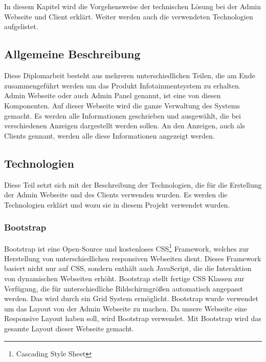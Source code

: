 \chapter{\docname}
\label{\docname}
In diesem Kapitel wird die Vorgehensweise der technischen L\"{o}sung bei der Admin Webseite und Client erkl\"{a}rt. Weiter werden auch die verwendeten Technologien aufgelistet. 

\section{Allgemeine Beschreibung}

Diese Diplomarbeit besteht aus mehreren unterschiedlichen Teilen, die am Ende zusammengef\"{u}hrt werden um das Produkt Infotainmentsystem zu erhalten. Admin Webseite oder auch Admin Panel genannt, ist eine von diesen Komponenten. Auf dieser Webseite wird die ganze Verwaltung des Systems gemacht. Es werden alle Informationen geschrieben und ausgew\"{a}hlt, die bei verschiedenen Anzeigen dargestellt werden sollen. An den Anzeigen, auch als Clients gennant, werden alle diese Informationen angezeigt werden. 


\section{Technologien}

Diese Teil setzt sich mit der Beschreibung der Technologien, die f\"{u}r die Erstellung der Admin Webseite und des Clients verwenden wurden. Es werden die Technologien erkl\"{a}rt und wozu sie in diesem Projekt verwendet wurden.



\subsection{Bootstrap}
Bootstrap ist eine Open-Source und kostenloses CSS\footnote{Cascading Style Sheet} Framework, welches zur Herstellung von unterschiedlichen responsiven Webseiten dient. Dieses Framework basiert nicht nur auf CSS, sondern enth\"{a}lt auch JavaScript, die die Interaktion von dynamischen Webseiten erh\"{o}ht. Bootstrap stellt fertige CSS Klassen zur Verf\"{u}gung, die f\"{u}r unterschiedliche Bildschirmgr\"{o}\ss{}en automatisch angepasst werden. Das wird durch ein Grid System erm\"{o}glicht. Bootstrap wurde verwendet um das Layout von der Admin Webseite zu machen. Da unsere Webseite eine Responsive Layout haben soll, wird Bootstrap verwendet. Mit Bootstrap wird das gesamte Layout dieser Webseite gemacht. \cite{40_bootstrap}


